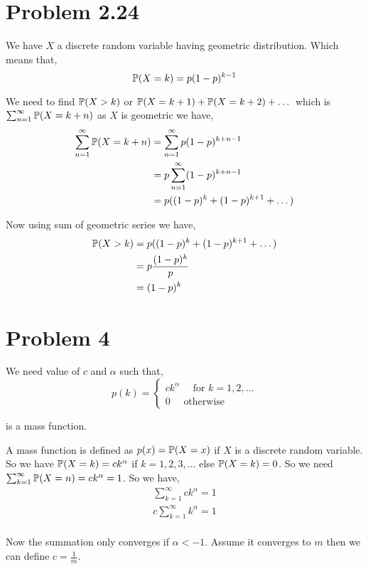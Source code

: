 \documentclass[a4paper]{report}
\begin{document}
\section*{Problem 2.24}

We have $X$ a discrete random variable having geometric distribution. Which means that, 
$$ \P(X = k) = p(1 - p)^{k - 1} $$ 

We need to find $\P(X > k)$ or  $\P(X = k + 1) + \P(X = k + 2) + \dots$ which is  $\sum_{n=1}^{\infty} \P(X = k + n)$ as $X $ is geometric we have, 
\begin{align*}
	\sum_{n=1}^{\infty} \P(X = k + n) &= 	\sum_{n=1}^{\infty} p (1 - p)^{k + n - 1}\\
					  &= p \sum_{n=1}^{\infty} (1- p)^{k + n - 1}\\
					  &= p ((1 - p)^{k} + (1 - p)^{k + 1}  + \dots)\\
\end{align*}

Now using sum of geometric series we have, 
\begin{align*}
	\P(X > k)&= p ((1 - p)^{k} + (1 - p)^{k + 1}  + \dots)\\
		 &= p\frac{(1 - p)^{k}}{p} \\
		 &= (1 - p)^{k}
\end{align*}

\section*{Problem 4} 
We need value of $c$ and  $\alpha$ such that,  
$$ p(k) = \begin{cases} ck^{\alpha} \quad \text{ for $k = 1,2, \dots$} \\ 0 \quad \text{ otherwise} \end{cases} $$ 

is a mass function.

\vspace{1em}

A mass function is defined as $p(x) = \P(X = x)$ if  $X$ is a discrete random variable. So we have  $\P(X = k) = ck^{\alpha}$ if $k = 1,2,3,\dots$ else  $\P(X = k) = 0$. So we need  $\sum_{k=1}^{\infty} \P(X = n) = ck^{\alpha} = 1$. So we have, 
\begin{align*}
	\sum_{k=1}^{\infty} ck^{\alpha}  = 1\\
	c \sum_{k=1}^{\infty} k^{\alpha} = 1\\
\end{align*}

Now the summation only converges if $\alpha < -1$. Assume it converges to  $m$ then we can define  $c = \frac{1}{m}$. 
\end{document}
